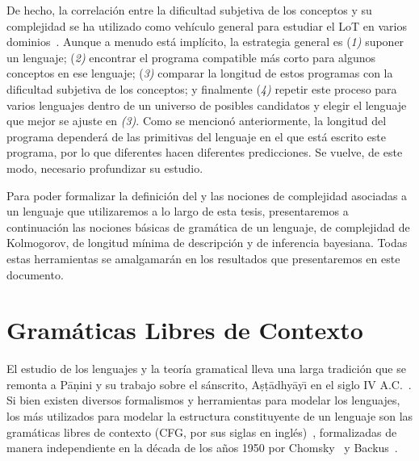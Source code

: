 De hecho, la correlación entre la dificultad subjetiva de los conceptos y su complejidad se ha utilizado como vehículo general para estudiar el LoT  en varios dominios~\cite{piantadosi2016logical, leeuwenberg1971perceptual, amalric2017language, lupyan2007language}. Aunque a menudo está implícito, la estrategia general es (\textit{1)} suponer un lenguaje; (\textit{2)} encontrar el programa compatible más corto para algunos conceptos en ese lenguaje; (\textit{3)} comparar la longitud de estos programas con la dificultad subjetiva de los conceptos; y finalmente (\textit{4)} repetir este proceso para varios lenguajes dentro de un universo de posibles candidatos y elegir el lenguaje que mejor se ajuste en \textit{(3)}. Como se mencionó anteriormente, la longitud del programa dependerá de las primitivas del lenguaje en el que está escrito este programa, por lo que diferentes \lot hacen diferentes predicciones. Se vuelve, de este modo, necesario profundizar su estudio.

Para poder formalizar la definición del \lot y las nociones de complejidad asociadas a un lenguaje que utilizaremos a lo largo de esta tesis, presentaremos a continuación las nociones básicas de gramática de un lenguaje, de complejidad de Kolmogorov, de longitud mínima de descripción y de inferencia bayesiana. Todas estas herramientas se amalgamarán en los resultados que presentaremos en este documento.

\section{Gramáticas Libres de Contexto}

El estudio de los lenguajes y la teoría gramatical lleva una larga tradición que se remonta a P{\=a}ṇini y su trabajo sobre el sánscrito, Aṣṭ{\=a}dhy{\=a}y{\=\i} en el siglo IV A.C.~\cite{katre1989}. Si bien existen diversos formalismos y herramientas para modelar los lenguajes, los más utilizados para modelar la estructura constituyente de un lenguaje son las gramáticas libres de contexto (CFG, por sus siglas en inglés)~\cite{keselj2009speech}, formalizadas de manera independiente en la década de los años 1950 por Chomsky~\cite{chomsky1956three} y Backus~\cite{backus1959syntax}.

